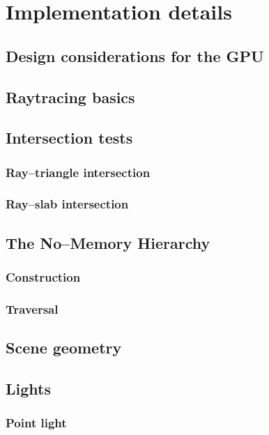 \chapter{Implementation details}

\section{Design considerations for the GPU}

\section{Raytracing basics}

\section{Intersection tests}

\subsection{Ray--triangle intersection}

\subsection{Ray--slab intersection}

\section{The No--Memory Hierarchy}

\subsection{Construction}

\subsection{Traversal}

\section{Scene geometry}

\section{Lights}

\subsection{Point light}

